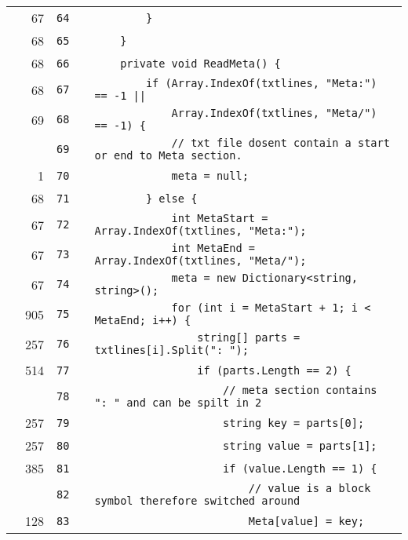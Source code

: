 \documentclass[a4paper,landscape,10pt]{article}
\begin{document}
\begin{longtable}[l]{lrrll}
\cellcolor{green} & 67 & \verb~64~ & & \verb~        }~\\
\cellcolor{green} & 68 & \verb~65~ & & \verb~    }~\\
\cellcolor{green} & 68 & \verb~66~ & & \verb~    private void ReadMeta() {~\\
\cellcolor{green} & 68 & \verb~67~ & & \verb~        if (Array.IndexOf(txtlines, "Meta:") == -1 ||~\\
\cellcolor{green} & 69 & \verb~68~ & & \verb~            Array.IndexOf(txtlines, "Meta/") == -1) {~\\
\cellcolor{gray} &  & \verb~69~ & & \verb~            // txt file dosent contain a start or end to Meta section.~\\
\cellcolor{green} & 1 & \verb~70~ & & \verb~            meta = null;~\\
\cellcolor{green} & 68 & \verb~71~ & & \verb~        } else {~\\
\cellcolor{green} & 67 & \verb~72~ & & \verb~            int MetaStart = Array.IndexOf(txtlines, "Meta:");~\\
\cellcolor{green} & 67 & \verb~73~ & & \verb~            int MetaEnd = Array.IndexOf(txtlines, "Meta/");~\\
\cellcolor{green} & 67 & \verb~74~ & & \verb~            meta = new Dictionary<string, string>();~\\
\cellcolor{green} & 905 & \verb~75~ & & \verb~            for (int i = MetaStart + 1; i < MetaEnd; i++) {~\\
\cellcolor{green} & 257 & \verb~76~ & & \verb~                string[] parts = txtlines[i].Split(": ");~\\
\cellcolor{green} & 514 & \verb~77~ & & \verb~                if (parts.Length == 2) {~\\
\cellcolor{gray} &  & \verb~78~ & & \verb~                    // meta section contains ": " and can be spilt in 2~\\
\cellcolor{green} & 257 & \verb~79~ & & \verb~                    string key = parts[0];~\\
\cellcolor{green} & 257 & \verb~80~ & & \verb~                    string value = parts[1];~\\
\cellcolor{green} & 385 & \verb~81~ & & \verb~                    if (value.Length == 1) {~\\
\cellcolor{gray} &  & \verb~82~ & & \verb~                        // value is a block symbol therefore switched around~\\
\cellcolor{green} & 128 & \verb~83~ & & \verb~                        Meta[value] = key;~\\

\end{longtable}
\end{document}

